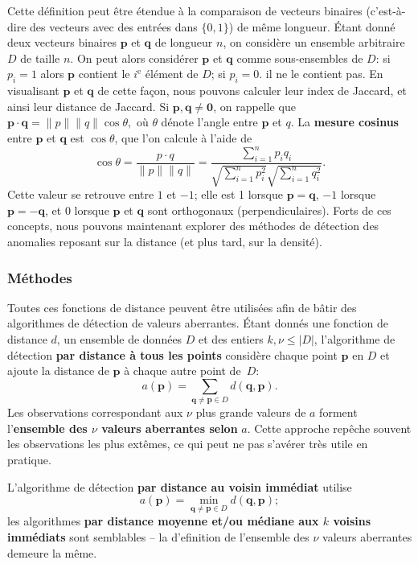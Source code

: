 Cette définition peut être étendue \`a la comparaison de vecteurs binaires (c'est-à-dire des vecteurs avec des entrées dans $\{0,1\}$) de même longueur.
Étant donné deux vecteurs binaires $\mathbf{p}$ et $\mathbf{q}$ de longueur $n$, on considère un ensemble arbitraire $D$ de taille $n$. On peut alors consid\'erer $\mathbf{p}$ et $\mathbf{q}$ comme sous-ensembles de $D$: si $p_i=1$ alors $\mathbf{p}$ contient le $i^{\text{e}}$ élément de $D$; si $p_i=0$. il ne le contient pas.  En visualisant $\mathbf{p}$ et $\mathbf{q}$ de cette façon, nous pouvons calculer leur index de Jaccard, et ainsi leur distance de Jaccard. \newline\newline
Si $\mathbf{p},\mathbf{q}\neq \mathbf{0}$, on rappelle que 
$\mathbf{p} \cdot \mathbf{q} 
= \lVert p \rVert \lVert q \rVert \cos\theta,$
o\`u $\theta$ d\'enote l'angle entre $\mathbf{p}$ et $q$.
La \textbf{mesure cosinus} entre $\mathbf{p}$ et $\mathbf{q}$ est $\cos\theta$, que l'on calcule \`a l'aide de 
$$
\cos\theta
= \frac{p \cdot q}{\lVert p \rVert \lVert q \rVert}
= \frac{\sum_{i=1}^n p_i q_i}{\sqrt{\sum_{i=1}^n p_i^2} \sqrt{\sum_{i=1}^n q_i^2}}.
$$
Cette valeur se retrouve entre $1$ et $-1$; elle est 1 lorsque  $\mathbf{p}=\mathbf{q}$, $-1$ lorsque  $\mathbf{p}=-\mathbf{q}$, et $0$ lorsque $\mathbf{p}$ et $\mathbf{q}$ sont orthogonaux (perpendiculaires).\newline\newline
Forts de ces concepts, nous pouvons maintenant explorer des méthodes de détection des anomalies reposant sur la distance (et plus tard, sur la densité). 

\subsubsection*{M\'ethodes}

Toutes ces fonctions de distance peuvent être utilisées afin de b\^atir des algorithmes de détection de valeurs aberrantes.%
\newline\newline Étant donnés une fonction de distance $d$, un ensemble de données $D$ et des entiers $k,\nu\leq |D|$, 
l'algorithme de détection  \textbf{par distance \`a tous les points} considère chaque point $\mathbf{p}$ en $D$ et ajoute la distance de $\mathbf{p}$ à chaque autre point de~$D$:
$$
a(\mathbf{p}) 
= \sum_{\mathbf{q}\neq \mathbf{p} \in D} d(\mathbf{q}, \mathbf{p}).
$$
Les observations correspondant aux $\nu$ plus grande valeurs de $a$ forment l'\textbf{ensemble des $\nu$ valeurs aberrantes selon} $a$. Cette approche rep\^eche  souvent les observations les plus ext\^emes, ce qui peut ne pas s'av\'erer tr\`es utile en pratique. \par
L'algorithme de d\'etection \textbf{par distance au voisin imm\'ediat} utilise 
$$
a(\mathbf{p}) 
= \min_{\mathbf{q}\neq \mathbf{p} \in D} d(\mathbf{q}, \mathbf{p});
$$ les algorithmes \textbf{par distance moyenne et/ou m\'ediane aux $k$ voisins imm\'ediats} sont semblables -- la d'efinition de l'ensemble des $\nu$ valeurs aberrantes demeure la m\^eme.

